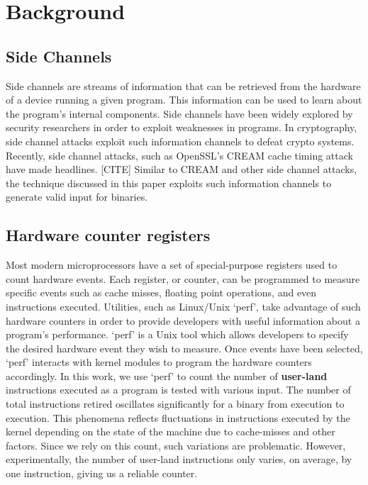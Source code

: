 \documentclass[10pt,twocolumn]{article}
\begin{document}
\section{Background} \label{background}
 
\subsection{Side Channels} \label{bg_sidechannels}

Side channels are streams of information that can be retrieved from the hardware of a device running a given program.
This information can be used to learn about the program's internal components.
Side channels have been widely explored by security researchers in order to exploit weaknesses in programs.
In cryptography, side channel attacks exploit such information channels to defeat crypto systems.
Recently, side channel attacks, such as OpenSSL's CREAM cache timing attack have made headlines. [CITE]
Similar to CREAM and other side channel attacks, the technique discussed in this paper exploits such information channels to generate valid input for binaries.

\subsection{Hardware counter registers} \label{bg_hardwarereg}

Most modern microprocessors have a set of special-purpose registers used to count hardware events.
Each register, or counter, can be programmed to measure specific events such as cache misses, floating point operations, and even instructions executed.
Utilities, such as Linux/Unix `perf', take advantage of such hardware counters in order to provide developers with useful information about a program's performance.
`perf' is a Unix tool which allows developers to specify the desired hardware event they wish to measure.
Once events have been selected, `perf' interacts with kernel modules to program the hardware counters accordingly.
In this work, we use `perf' to count the number of \textbf{user-land} instructions executed as a program is tested with various input.
The number of total instructions retired oscillates significantly for a binary from execution to execution.
This phenomena reflects fluctuations in instructions executed by the kernel depending on the state of the machine due to cache-misses and other factors.
Since we rely on this count, such variations are problematic.
However, experimentally, the number of user-land instructions only varies, on average, by one instruction, giving us a reliable counter.
\end{document}
